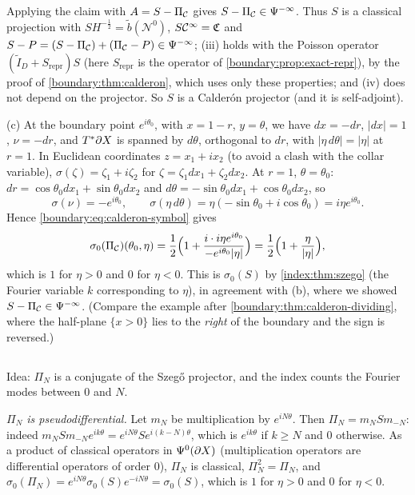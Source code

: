 Applying the claim with $A=S-\Pi_{\mathcal{C}}$ gives $S-\Pi_{\mathcal{C}}\in\Psi^{-\infty}$. Thus $S$ is a
classical projection with $SH^{-\frac12}=\tilde b(\mathcal N^0)$, $S\mathcal{C}^\infty=\mathfrak{C}$ and
$S-P=(S-\Pi_{\mathcal{C}})+(\Pi_{\mathcal{C}}-P)\in\Psi^{-\infty}$; (iii) holds with the Poisson operator
$(\tilde I_D+S_{\mathrm{repr}})S$ (here $S_{\mathrm{repr}}$ is the operator of
\cref{boundary:prop:exact-repr}), by the proof of \cref{boundary:thm:calderon}, which uses
only these properties; and (iv) does not depend on the projector. So $S$ is a Calder\'on
projector (and it is self-adjoint).

(c) At the boundary point $e^{i\theta_0}$, with $x=1-r$, $y=\theta$, we have $dx=-dr$,
$|dx|=1$, $\nu=-dr$, and $T^*\partial X$ is spanned by $d\theta$, orthogonal to $dr$, with
$|\eta\,d\theta|=|\eta|$ at $r=1$. In Euclidean coordinates $z=x_1+ix_2$ (to avoid a clash
with the collar variable), $\sigma(\zeta)=\zeta_1+i\zeta_2$ for $\zeta=\zeta_1dx_1+\zeta_2
dx_2$. At $r=1$, $\theta=\theta_0$: $dr=\cos\theta_0dx_1+\sin\theta_0dx_2$ and $d\theta=
-\sin\theta_0dx_1+\cos\theta_0dx_2$, so
\begin{equation*}
\sigma(\nu)=-e^{i\theta_0},\qquad\sigma(\eta\,d\theta)=\eta(-\sin\theta_0+i\cos\theta_0)=
i\eta e^{i\theta_0}.
\end{equation*}
Hence \eqref{boundary:eq:calderon-symbol} gives
\begin{equation*}
\sigma_0(\Pi_{\mathcal{C}})(\theta_0,\eta)=\frac12\Big(1+\frac{i\cdot i\eta e^{i\theta_0}}{-e^{i\theta_0}
|\eta|}\Big)=\frac12\Big(1+\frac\eta{|\eta|}\Big),
\end{equation*}
which is $1$ for $\eta>0$ and $0$ for $\eta<0$. This is $\sigma_0(S)$ by
\cref{index:thm:szego} (the Fourier variable $k$ corresponding to $\eta$), in agreement with
(b), where we showed $S-\Pi_{\mathcal{C}}\in\Psi^{-\infty}$. (Compare the example after
\cref{boundary:thm:calderon-dividing}, where the half-plane $\{x>0\}$ lies to the
\emph{right} of the boundary and the sign is reversed.)

\subsection*{}
Idea: $\Pi_N$ is a conjugate of the Szeg\H{o} projector, and the index counts the Fourier
modes between $0$ and $N$.

\emph{$\Pi_N$ is pseudodifferential.} Let $m_N$ be multiplication by $e^{iN\theta}$. Then
$\Pi_N=m_NSm_{-N}$: indeed $m_NSm_{-N}e^{ik\theta}=e^{iN\theta}S e^{i(k-N)\theta}$, which
is $e^{ik\theta}$ if $k\ge N$ and $0$ otherwise. As a product of classical operators in
$\Psi^{0}(\partial X)$ (multiplication operators are differential operators of order $0$),
$\Pi_N$ is classical, $\Pi_N^2=\Pi_N$, and $\sigma_0(\Pi_N)=e^{iN\theta}\sigma_0(S)e^{-iN
\theta}=\sigma_0(S)$, which is $1$ for $\eta>0$ and $0$ for $\eta<0$.

